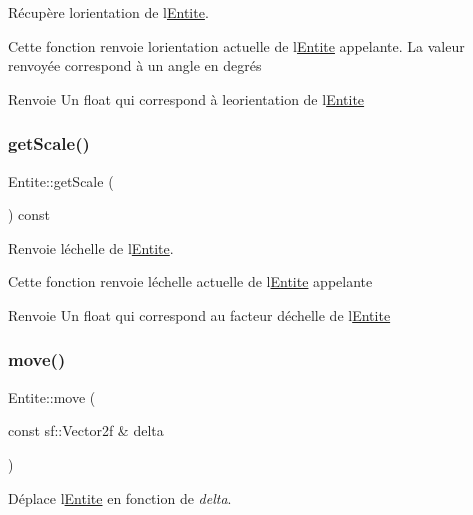 Récupère l\textquotesingle{}orientation de l\textquotesingle{}\hyperlink{class_entite}{Entite}. 

Cette fonction renvoie l\textquotesingle{}orientation actuelle de l\textquotesingle{}\hyperlink{class_entite}{Entite} appelante. La valeur renvoyée correspond à un angle en degrés \begin{DoxyReturn}{Renvoie}
Un {\ttfamily float} qui correspond à l\textquotesingle{}eorientation de l\textquotesingle{}\hyperlink{class_entite}{Entite} 
\end{DoxyReturn}
\mbox{\label{class_entite_a5f70868f62049291edf4b245a531a6e0}} 
\subsubsection{\texorpdfstring{get\+Scale()}{getScale()}}
{\footnotesize\ttfamily Entite\+::get\+Scale (\begin{DoxyParamCaption}{ }\end{DoxyParamCaption}) const}



Renvoie l\textquotesingle{}échelle de l\textquotesingle{}\hyperlink{class_entite}{Entite}. 

Cette fonction renvoie l\textquotesingle{}échelle actuelle de l\textquotesingle{}\hyperlink{class_entite}{Entite} appelante \begin{DoxyReturn}{Renvoie}
Un {\ttfamily float} qui correspond au facteur d\textquotesingle{}échelle de l\textquotesingle{}\hyperlink{class_entite}{Entite} 
\end{DoxyReturn}
\mbox{\label{class_entite_ac409613f3cf67cae14babd4b16811c8f}} 
\subsubsection{\texorpdfstring{move()}{move()}}
{\footnotesize\ttfamily Entite\+::move (\begin{DoxyParamCaption}\item[{const sf\+::\+Vector2f \&}]{delta }\end{DoxyParamCaption})}



Déplace l\textquotesingle{}\hyperlink{class_entite}{Entite} en fonction de {\itshape delta}. 

